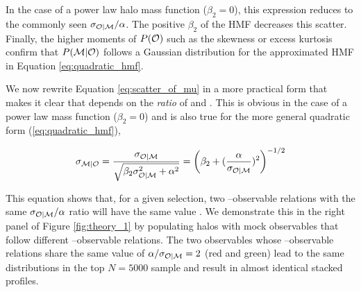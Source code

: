 \documentclass[fleqn,usenatbib,useAMS]{mnras}
\begin{document}
    \noindent In the case of a power law halo mass function ($\beta_2 = 0$), this expression reduces
    to the commonly seen $\sigma_{\mathcal{O} | \mathcal{M}} / \alpha$. 
    The positive $\beta_2$ of the HMF decreases this scatter. 
    Finally, the higher moments of $P({\mathcal{O}}{})$ such as the skewness or excess kurtosis confirm
    that $P({\mathcal{M}}{} | {\mathcal{O}}{})$ follows a Gaussian distribution for the approximated HMF in
    Equation \ref{eq:quadratic_hmf}.

    We now rewrite Equation \ref{eq:scatter_of_mu} in a more practical form that makes it clear
    that \scatterMhaloObsSym{} depends on the {\em ratio} of \scatterObsSymMhalo{} and \slope.
    This is obvious in the case of a power law mass function ($\beta_2 = 0$) and is also true
    for the more general quadratic form (\ref{eq:quadratic_hmf}),

    \begin{equation}
        \sigma_{\mathcal{M} | \mathcal{O}}{}
        = \frac{\sigma_{\mathcal{O} | \mathcal{M}}}{\sqrt{\beta_2 \sigma_{\mathcal{O} | \mathcal{M}}^2 + \alpha^2}}
        = \left(\beta_2 + (\frac{\alpha}{\sigma_{\mathcal{O} | \mathcal{M}}})^2\right)^{-1/2}
        \label{eq:ratio_is_what_matters}
    \end{equation}

    This equation shows that, for a given \topn{} selection, two \mvir{}--observable relations with
    the same $\sigma_{\mathcal{O} | \mathcal{M}} / \alpha$ ratio will have the same value \scatterMhaloObsSym{}. 
    We demonstrate this in the right panel of Figure \ref{fig:theory_1} by populating  halos
    with mock observables that follow different \mvir{}--observable relations.
    The two observables whose \mvir{}--observable relations share the same value of $ \alpha /
    \sigma_{\mathcal{O} | \mathcal{M}} = 2$ (red and green) lead to the same \mvir{} distributions in the top
    $N=5000$ sample and result in almost identical stacked \dsigma{} profiles.
\end{document}
